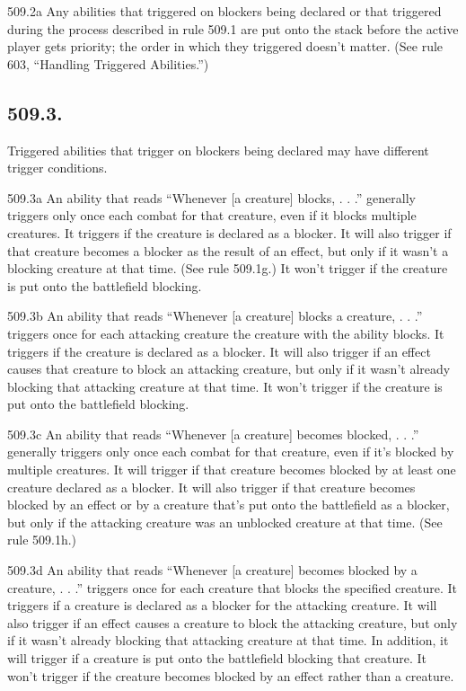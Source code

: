 509.2a Any abilities that triggered on blockers being declared or that triggered during the process described in rule 509.1 are put onto the stack before the active player gets priority; the order in which they triggered doesn’t matter. (See rule 603, “Handling Triggered Abilities.”)

\subsection*{509.3.}
Triggered abilities that trigger on blockers being declared may have different trigger conditions.

509.3a An ability that reads “Whenever [a creature] blocks, . . .” generally triggers only once each combat for that creature, even if it blocks multiple creatures. It triggers if the creature is declared as a blocker. It will also trigger if that creature becomes a blocker as the result of an effect, but only if it wasn’t a blocking creature at that time. (See rule 509.1g.) It won’t trigger if the creature is put onto the battlefield blocking.

509.3b An ability that reads “Whenever [a creature] blocks a creature, . . .” triggers once for each attacking creature the creature with the ability blocks. It triggers if the creature is declared as a blocker. It will also trigger if an effect causes that creature to block an attacking creature, but only if it wasn’t already blocking that attacking creature at that time. It won’t trigger if the creature is put onto the battlefield blocking.

509.3c An ability that reads “Whenever [a creature] becomes blocked, . . .” generally triggers only once each combat for that creature, even if it’s blocked by multiple creatures. It will trigger if that creature becomes blocked by at least one creature declared as a blocker. It will also trigger if that creature becomes blocked by an effect or by a creature that’s put onto the battlefield as a blocker, but only if the attacking creature was an unblocked creature at that time. (See rule 509.1h.)

509.3d An ability that reads “Whenever [a creature] becomes blocked by a creature, . . .” triggers once for each creature that blocks the specified creature. It triggers if a creature is declared as a blocker for the attacking creature. It will also trigger if an effect causes a creature to block the attacking creature, but only if it wasn’t already blocking that attacking creature at that time. In addition, it will trigger if a creature is put onto the battlefield blocking that creature. It won’t trigger if the creature becomes blocked by an effect rather than a creature.

